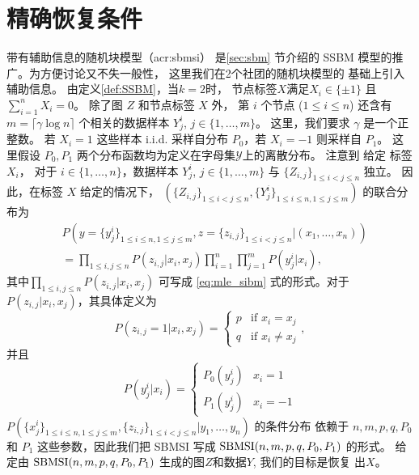 \section{精确恢复条件}\label{sec:sbmsi_exact_recovery_condition}
带有辅助信息的随机块模型（\gls{acr:sbmsi}）
是\ref{sec:sbm} 节介绍的
SSBM 模型的推广。为方便讨论又不失一般性，
这里我们在2个社团的随机块模型的
基础上引入辅助信息。
由定义\ref{def:SSBM}，当$k=2$时，
节点标签$X$满足$X_i \in \{\pm 1\}$
且 $\sum_{i=1}^n X_i = 0$。
除了图 $Z$ 和节点标签 $X$ 外，
第 $i$  个节点 ($1\leq i \leq n$) 
还含有 $m=\lceil \gamma \log n \rceil $ 个相关的数据样本 
$Y^{i}_{j}$, $j\in \{1,\ldots,m\}$。
这里，我们要求 $\gamma$ 是一个正整数。
若 $X_i=1$
这些样本 i.i.d. 采样自分布 $P_0$，若  $X_i=-1$ 则采样自 $P_1$。
这里假设 $P_0, P_1$ 两个分布函数均为定义在字母集$\mathcal{Y}$上的离散分布。
注意到 给定 标签 $X_i$，
对于 $i\in\{1,\ldots,n\}$，数据样本 $Y^{i}_{j}$, $j\in \{1,\ldots,m\}$ 与 $\{Z_{i,j}\}_{1\le i<j\le n}$ 独立。
 因此，在标签 $X$ 给定的情况下，
  $(\{Z_{i,j}\}_{1\le i<j\le n},\{Y^i_{j}\}_{1\le i\le n,1\le j\le m})$ 的联合分布为  
\begin{align}\label{eq:lh}
    &P(y=\{y^i_{j}\}_{1\le i\le n,1\le j\le m},z=\{z_{i,j}\}_{1\le i<j\le n}| (x_1,\ldots,x_n)) \nonumber\\
    &= \prod_{1\le i,j\le n}P(z_{i,j}|x_i,x_j)\prod_{i=1}^n \prod_{j=1}^m P(y^i_j|x_i), 
\end{align}
其中$\prod_{1\le i,j\le n}P(z_{i,j}|x_i,x_j)$ 可写成
\eqref{eq:mle_sibm} 式的形式。对于$P(z_{i,j}|x_i,x_j)$，其具体定义为
\begin{equation*}
    P  (z_{i,j}=1|x_i,x_j) = \begin{cases}
        p & \text{if } x_i = x_j \\
        q & \text{if } x_i\ne x_j
    \end{cases},
\end{equation*}
并且
\begin{equation*}
    P(y^i_j|x_i) = \begin{cases}
        P_0(y^i_j) & x_i = 1 \\
        P_1(y^i_j) & x_i = -1
    \end{cases}
\end{equation*}
 $P(\{x^i_{j}\}_{1\le i\le n,1\le j\le m},\{z_{i,j}\}_{1\le i<j\le n}| y_1,\ldots,y_n)$ 
 的条件分布 依赖于
 $n,m,p, q, P_0$ 和 $P_1$ 这些参数，因此我们把 SBMSI 写成 $\operatorname{SBMSI}(n,m,p,q,P_0,P_1)$ 的形式。
 给定由 $\operatorname{SBMSI}(n,m,p,q,P_0,P_1)$ 生成的图$Z$和数据$Y$, 我们的目标是恢复 出$X$。
 

